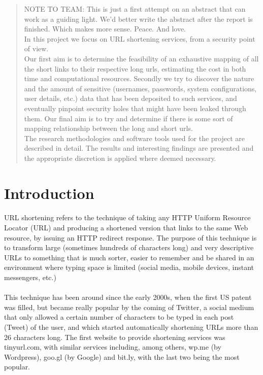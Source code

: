 \documentclass[12pt]{article}
\begin{document}
\begin{abstract}

\noindent
NOTE TO TEAM: This is just a first attempt on an abstract that can work as a guiding light. We'd better write the abstract after the report is finished. Which makes more sense. Peace. And love. \\[0.5cm]
In this project we focus on URL shortening services, from a security point of view.\\ Our first aim is to determine the feasibility of an exhaustive mapping of all the short links to their respective long urls, estimating the cost in both time and computational resources. Secondly we try to discover the nature and the amount of sensitive (usernames, passwords, system configurations, user details, etc.) data that has been deposited to such services, and eventually pinpoint security holes that might have been leaked through them. Our final aim is to try and determine if there is some sort of mapping relationship between the long and short urls. \\
The research methodologies and software tools used for the project are described in detail. The results and interesting findings are presented and the appropriate discretion is applied where deemed necessary. 


\end{abstract}
\newpage

%
\section{Introduction}

%
\paragraph{}
URL shortening refers to the technique of taking any HTTP Uniform Resource Locator (URL) and producing a shortened version that links to the same Web resource, by issuing an HTTP redirect response. The purpose of this technique is to transform large (sometimes hundreds of characters long) and very descriptive URLs to something that is much sorter, easier to remember and be shared in an environment where typing space is limited (social media, mobile devices, instant messengers, etc.)
\paragraph{}
This technique has been around since the early 2000s, when the first US patent was filled, but became really popular by the coming of Twitter, a social medium that only allowed a certain number of characters to be typed in each post (Tweet) of the user, and which started automatically shortening URLs more than 26 characters long. The first website to provide shortening services was tinyurl.com, with similar services including, among others, wp.me (by Wordpress), goo.gl (by Google) and bit.ly, with the last two being the most popular. 
\end{document}

